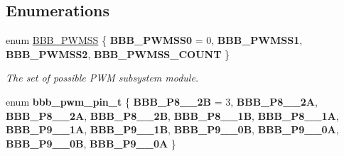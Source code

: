 \subsection*{Enumerations}
\begin{DoxyCompactItemize}
\item 
enum \mbox{\hyperlink{bbb-pwm_8h_a8e1f51037d4bbe9c36217634f75a628e}{B\+B\+B\+\_\+\+P\+W\+M\+SS}} \{ {\bfseries B\+B\+B\+\_\+\+P\+W\+M\+S\+S0} = 0, 
{\bfseries B\+B\+B\+\_\+\+P\+W\+M\+S\+S1}, 
{\bfseries B\+B\+B\+\_\+\+P\+W\+M\+S\+S2}, 
{\bfseries B\+B\+B\+\_\+\+P\+W\+M\+S\+S\+\_\+\+C\+O\+U\+NT}
 \}
\begin{DoxyCompactList}\small\item\em The set of possible P\+WM subsystem module. \end{DoxyCompactList}\item 
\mbox{\label{bbb-pwm_8h_a122e88970f53da9813867c4a89012bcc}} 
enum {\bfseries bbb\+\_\+pwm\+\_\+pin\+\_\+t} \{ \newline
{\bfseries B\+B\+B\+\_\+\+P8\+\_\+\_\+2B} = 3, 
{\bfseries B\+B\+B\+\_\+\+P8\+\_\+\_\+2A}, 
{\bfseries B\+B\+B\+\_\+\+P8\+\_\+\_\+2A}, 
{\bfseries B\+B\+B\+\_\+\+P8\+\_\+\_\+2B}, 
\newline
{\bfseries B\+B\+B\+\_\+\+P8\+\_\+\_\+1B}, 
{\bfseries B\+B\+B\+\_\+\+P8\+\_\+\_\+1A}, 
{\bfseries B\+B\+B\+\_\+\+P9\+\_\+\_\+1A}, 
{\bfseries B\+B\+B\+\_\+\+P9\+\_\+\_\+1B}, 
\newline
{\bfseries B\+B\+B\+\_\+\+P9\+\_\+\_\+0B}, 
{\bfseries B\+B\+B\+\_\+\+P9\+\_\+\_\+0A}, 
{\bfseries B\+B\+B\+\_\+\+P9\+\_\+\_\+0B}, 
{\bfseries B\+B\+B\+\_\+\+P9\+\_\+\_\+0A}
 \}
\end{DoxyCompactItemize}
